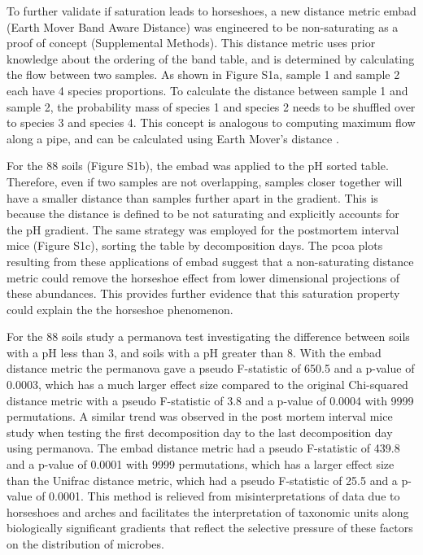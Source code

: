 To further validate if saturation leads to horseshoes, a new distance metric \gls{embad} (Earth Mover Band Aware Distance) was engineered to be non-saturating as a proof of concept (Supplemental Methods).  This distance metric uses prior knowledge about the ordering of the band table, and is determined by calculating the flow between two samples. As shown in Figure S1a, sample 1 and sample 2 each have 4 species proportions.  To calculate the distance between sample 1 and sample 2, the probability mass of species 1 and species 2 needs to be shuffled over to species 3 and species 4.  This concept is analogous to computing maximum flow along a pipe, and can be calculated using Earth Mover's distance \cite{emd}\cite{unifrac_emd}\cite{unifrac}.\par
For the 88 soils (Figure S1b), the \gls{embad} was applied to the pH sorted table. Therefore, even if two samples are not overlapping, samples closer together will have a smaller distance than samples further apart in the gradient.  This is because the distance is defined to be not saturating and explicitly accounts for the pH gradient.  The same strategy was employed for the postmortem interval mice (Figure S1c), sorting the table by decomposition days. The \gls{pcoa} plots resulting from these applications of \gls{embad} suggest that a non-saturating distance metric could remove the horseshoe effect from lower dimensional projections of these abundances.  This provides further evidence that this saturation property could explain the the horseshoe phenomenon.\par
For the 88 soils study a \gls{permanova} test investigating the difference between soils with a pH less than 3, and soils with a pH greater than 8.  With the \gls{embad} distance metric the \gls{permanova} gave a pseudo F-statistic of 650.5 and a p-value of 0.0003, which has a much larger effect size compared to the original Chi-squared distance metric with a pseudo F-statistic of 3.8 and a p-value of 0.0004 with 9999 permutations.  A similar trend was observed in the post mortem interval mice study when testing the first decomposition day to the last decomposition day using \gls{permanova}.  The \gls{embad} distance metric had a pseudo F-statistic of 439.8 and a p-value of 0.0001 with 9999 permutations, which has a larger effect size than the Unifrac distance metric, which had a pseudo F-statistic of 25.5 and a p-value of 0.0001. This method is relieved from misinterpretations of data due to horseshoes and arches and facilitates the interpretation of taxonomic units along biologically significant gradients that reflect the selective pressure of these factors on the distribution of microbes.  \par
